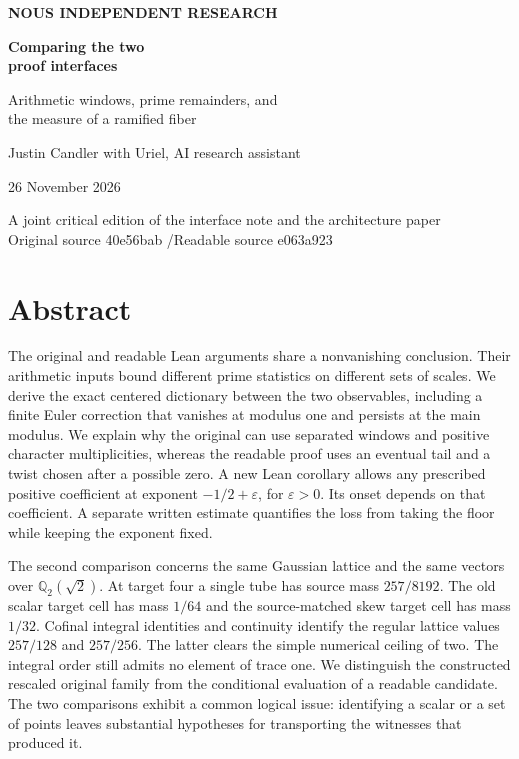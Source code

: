 \documentclass[12pt,letterpaper]{article}
\begin{document}
\thispagestyle{empty}
\begin{center}\vspace*{.5in}
{\sffamily\small\bfseries\color{accent}NOUS INDEPENDENT RESEARCH}\par\vspace{.55in}
{\fontsize{32}{38}\selectfont\bfseries\color{ink}Comparing the two\\proof interfaces}\par\vspace{.25in}
{\Large Arithmetic windows, prime remainders, and\\the measure of a ramified fiber}\par\vspace{.34in}
\par\vspace{.42in}
{\large Justin Candler with Uriel, AI research assistant}\par 26 November 2026
\end{center}\vfill\begin{center}\small\sffamily A joint critical edition of the interface note and the architecture paper\\
Original source 40e56bab \enspace/\enspace Readable source e063a923\end{center}
\clearpage\section*{Abstract}
The original and readable Lean arguments share a nonvanishing conclusion. Their arithmetic inputs bound different prime statistics on different sets of scales. We derive the exact centered dictionary between the two observables, including a finite Euler correction that vanishes at modulus one and persists at the main modulus. We explain why the original can use separated windows and positive character multiplicities, whereas the readable proof uses an eventual tail and a twist chosen after a possible zero. A new Lean corollary allows any prescribed positive coefficient at exponent $-1/2+\varepsilon$, for $\varepsilon>0$. Its onset depends on that coefficient. A separate written estimate quantifies the loss from taking the floor while keeping the exponent fixed.

The second comparison concerns the same Gaussian lattice and the same vectors over $\mathbb Q_2(\sqrt2)$. At target four a single tube has source mass $257/8192$. The old scalar target cell has mass $1/64$ and the source-matched skew target cell has mass $1/32$. Cofinal integral identities and continuity identify the regular lattice values $257/128$ and $257/256$. The latter clears the simple numerical ceiling of two. The integral order still admits no element of trace one. We distinguish the constructed rescaled original family from the conditional evaluation of a readable candidate. The two comparisons exhibit a common logical issue: identifying a scalar or a set of points leaves substantial hypotheses for transporting the witnesses that produced it.
\end{document}
